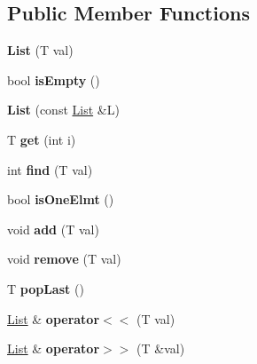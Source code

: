 \subsection*{Public Member Functions}
\begin{DoxyCompactItemize}
\item 
\mbox{\label{class_list_ac657a86ef824f9ec5fea01e15445d231}} 
{\bfseries List} (T val)
\item 
\mbox{\label{class_list_a73f8b1d313382daffeeeed552f42da2f}} 
bool {\bfseries is\+Empty} ()
\item 
\mbox{\label{class_list_a70aec33dadb7d317f83f1eb4090cfc51}} 
{\bfseries List} (const \mbox{\hyperlink{class_list}{List}} \&L)
\item 
\mbox{\label{class_list_a560c8d6e0ded475626c67661ee24757e}} 
T {\bfseries get} (int i)
\item 
\mbox{\label{class_list_ab79d41fb024f8315a0bf2730be8b3554}} 
int {\bfseries find} (T val)
\item 
\mbox{\label{class_list_a0f4a4d47dc4f9184fe341de6f83031cd}} 
bool {\bfseries is\+One\+Elmt} ()
\item 
\mbox{\label{class_list_a8dc109bc3840706b2ff77c30a01b1f14}} 
void {\bfseries add} (T val)
\item 
\mbox{\label{class_list_a45978e2ed970993afbf0e5429a5a67d0}} 
void {\bfseries remove} (T val)
\item 
\mbox{\label{class_list_a28487cea2818c83adbf1187312340db9}} 
T {\bfseries pop\+Last} ()
\item 
\mbox{\label{class_list_a87b60ed1c9d849738551043b0368b2df}} 
\mbox{\hyperlink{class_list}{List}} \& {\bfseries operator$<$$<$} (T val)
\item 
\mbox{\label{class_list_adb7eaeb3f3d763702a08f329d0efb574}} 
\mbox{\hyperlink{class_list}{List}} \& {\bfseries operator$>$$>$} (T \&val)
\item 
\mbox{\label{class_list_a91bfb3d2b503208f0e163369794fe668}} 

\end{DoxyCompactItemize}
